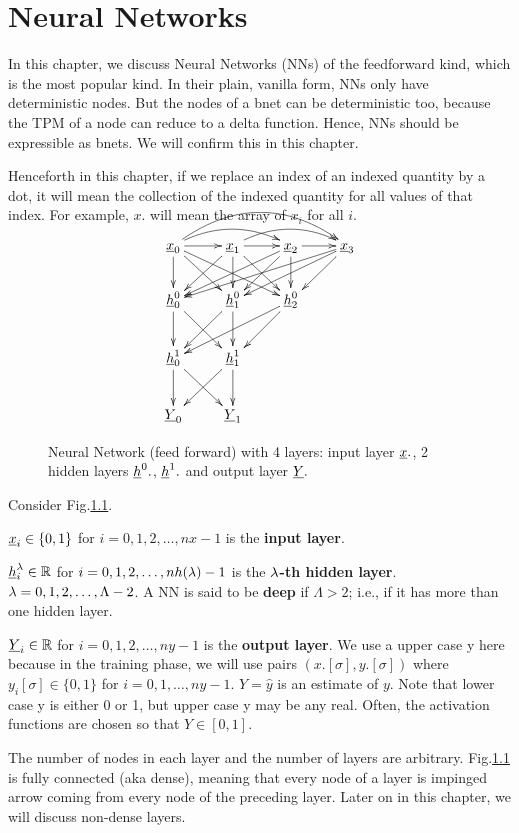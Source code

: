 \chapter{Neural Networks}\label{ch-nn}

In this chapter, we discuss
 Neural Networks (NNs) of the
feedforward kind,
which is the most popular kind. In their
 plain, vanilla form, NNs only
have deterministic nodes.
But the nodes of a bnet can
be deterministic too, because
the TPM
of a node
can reduce to a delta function.
Hence, NNs should be expressible
as bnets. We will confirm this
in this chapter.

Henceforth in this chapter,
if we replace an index of an
indexed quantity by a dot, 
it will mean the collection
of the indexed quantity
for all values of that
index. For example, $x.$
will mean the 
array of $x_i$ for all $i$.


\begin{figure}[h!]
\centering
$$\xymatrix{
\rvx_0\ar@/^1pc/[rr]
\ar@/^2pc/[rrr]
\ar[d]\ar[dr]\ar[drr]\ar[r]&
\rvx_1\ar@/^1pc/[rr]
 \ar[dl]\ar[d]\ar[dr]\ar[r]&
\rvx_2\ar[dll]\ar[dl]\ar[d]\ar[r]&
\rvx_3\ar[dlll]\ar[dll]\ar[dl]\\
\rvh_0^0\ar[d]\ar[dr]&
\rvh_1^0\ar[dl]\ar[d]&
\rvh_2^0\ar[dll]\ar[dl]\\
\rvh_0^1\ar[d]\ar[dr]&
\rvh_1^1\ar[dl]\ar[d]\\
\rvY_0&
\rvY_1
}$$
\caption{Neural Network (feed forward)
with 4 layers: input layer ${\underline{x}}.$,
2 hidden layers ${\underline{h}}^0.$,
${\underline{h}}^1.$ and
output layer ${\underline{Y}}.$ }
\label{fig-nn}
\end{figure}

Consider Fig.\ref{fig-nn}.

${\underline{x}}_i\in 
\{0,1\}$ for 
$i=0, 1, 2, \dots,nx-1$
is the \textbf{input layer}.

${\underline{h}}_i^\lambda\in { \mathbb{R}}$ for 
$i=0, 1, 2, \dots,nh(\lambda)-1$
is the $\lambda$\textbf{-th hidden layer}.
$\lambda=0, 1, 2, \ldots, \Lambda-2$.
A NN is said to be {\bf deep} if
$\Lambda>2$; i.e., if it has 
more than one hidden layer.

${\underline{Y}}_i\in { \mathbb{R}}$ for 
$i=0, 1, 2, \dots,ny-1$
is the \textbf{output layer}.
We use a upper case y
here because in the training phase,
we will use pairs $(x.[\sigma],y.[\sigma])$ where
$y_i[\sigma]\in \{0,1\}$
for $i=0, 1, \ldots, ny-1$.
$Y=\hat{y}$
is an estimate of $y$.
Note that lower case y is 
either 0 or 1, 
but upper case y may be 
any real. Often, the
activation
functions are chosen so that
$Y\in[0,1]$. 
 

The number of nodes in each layer 
and the number of layers are arbitrary.
Fig.\ref{fig-nn} is fully connected 
(aka dense), meaning that every node
of a layer is impinged 
arrow coming 
from every node of the preceding
layer. Later on in this chapter,
we will
discuss non-dense layers.

